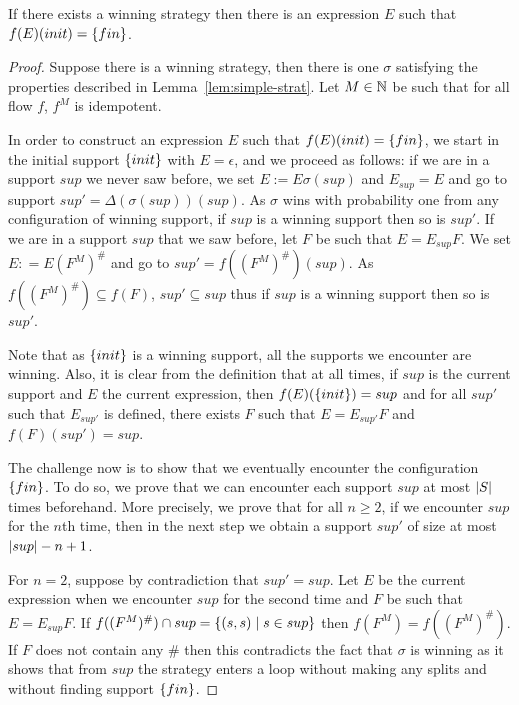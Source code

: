 \documentclass{article}
\begin{document}
\begin{lemma}
	\label{lem:strat-to-exp}
	If there exists a winning strategy then there is an expression $E$ such that $f(E)(init) =\{ fin \}$.
\end{lemma}

\begin{proof}
	Suppose there is a winning strategy, then there is one $\sigma$ satisfying the properties described in Lemma~\ref{lem:simple-strat}. 
	Let $M \in \mathbb{N}$ be such that for all flow $f$, $f^M$ is idempotent.
	
	In order to construct an expression $E$ such that $f(E)(init) =\{ fin \}$, we start in the initial support $\{ init \}$ with $E = \epsilon$, and we proceed as follows:
	if we are in a support $sup$ we never saw before, we set $E := E\sigma(sup)$ and $E_{sup} = E$ and go to support $sup' = \Delta(\sigma(sup))(sup)$. As $\sigma$ wins with probability one from any configuration of winning support, if $sup$ is a winning support then so is $sup'$.
	If we are in a support $sup$ that we saw before, let $F$ be such that $E = E_{sup} F$. We set $E : = E (F^M)^\#$ and go to $sup' = f((F^M)^\#)(sup)$.
	As $f((F^M)^\#) \subseteq f(F)$, $sup' \subseteq sup$ thus if $sup$ is a winning support then so is $sup'$.
	
	Note that as $\{ init \}$ is a winning support, all the supports we encounter are winning.
	Also, it is clear from the definition that at all times, if $sup$ is the current support and $E$ the current expression, then $f(E)(\{ init \}) = sup$ and for all $sup'$ such that $E_{sup'}$ is defined, there exists $F$ such that $E = E_{sup'} F$ and $f(F)(sup') = sup$.
	
	The challenge now is to show that we eventually encounter the configuration $\{ fin \}$.
	To do so, we prove that we can encounter each support $sup$ at most $|S|$ times beforehand. More precisely, we prove that for all $n\geq 2$, if we encounter $sup$ for the $n$th time, then in the next step we obtain a support $sup'$ of size at most $|sup|-n+1$.
	
	For $n = 2$, suppose by contradiction that $sup' = sup$. Let $E$ be the current expression when we encounter $sup$ for the second time and $F$ be such that $E = E_{sup} F$. If $f((F^M)^\#) \cap sup = \{ (s,s) \mid s\in sup \}$ then $f(F^M) = f((F^M)^\#)$. If $F$ does not contain any $\#$ then this contradicts the fact that $\sigma$ is winning as it shows that from $sup$ the strategy enters a loop without making any splits and without finding support $\{ fin \}$.
	 

\end{proof}
\end{document}
